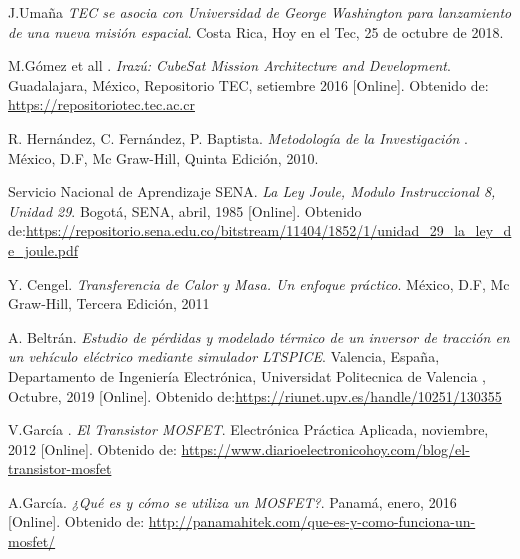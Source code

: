 \documentclass[notitlepage,oneside]{book}
\begin{document}







%
%
%
%
%
%
%
%
%
%

\begin{thebibliography}{99}
J.Umaña \emph{TEC se asocia con Universidad de George Washington para lanzamiento de una nueva misión espacial}. Costa Rica, Hoy en el Tec, 25 de octubre de 2018.

M.Gómez et all . \emph {Irazú: CubeSat Mission Architecture and Development}. Guadalajara, México, Repositorio TEC, setiembre 2016 [Online]. Obtenido de: \url{https://repositoriotec.tec.ac.cr}

R. Hernández, C. Fernández, P. Baptista. \emph {Metodología de la Investigación }. México, D.F, Mc Graw-Hill, Quinta Edición, 2010.

Servicio Nacional de Aprendizaje SENA. \emph {La Ley Joule, Modulo Instruccional 8, Unidad 29}. Bogotá, SENA, abril, 1985 [Online]. Obtenido de:\url{https://repositorio.sena.edu.co/bitstream/11404/1852/1/unidad_29_la_ley_de_joule.pdf}

Y. Cengel. \emph {Transferencia de Calor y Masa. Un enfoque práctico}. México, D.F, Mc Graw-Hill, Tercera Edición, 2011

A. Beltrán. \emph {Estudio de pérdidas y modelado térmico de un inversor de tracción en un vehículo eléctrico mediante simulador LTSPICE}. Valencia, España, Departamento de Ingeniería Electrónica, Universidat  Politecnica de Valencia , Octubre, 2019 [Online]. Obtenido de:\url{https://riunet.upv.es/handle/10251/130355} %

V.García . \emph {El Transistor MOSFET}. Electrónica Práctica Aplicada, noviembre, 2012 [Online]. Obtenido de: \url{https://www.diarioelectronicohoy.com/blog/el-transistor-mosfet}

A.García. \emph {¿Qué es y cómo se utiliza un MOSFET?}. Panamá, enero, 2016 [Online]. Obtenido de: \url{http://panamahitek.com/que-es-y-como-funciona-un-mosfet/}


\end{thebibliography}
\end{document}

